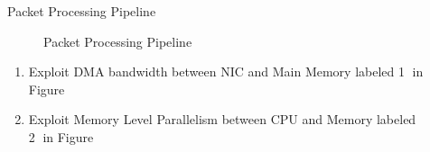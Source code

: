 \documentclass[final]{beamer}
\newlength{\sepwid}
\newlength{\onecolwid}
\newlength{\twocolwid}
\begin{document}
\begin{frame}
\begin{columns}[t]
\begin{column}{\onecolwid}
\begin{exampleblock}{Packet Processing Pipeline}
\begin{figure}
\caption{Packet Processing Pipeline}
\end{figure}
\begin{enumerate}[*]
 \item Exploit DMA bandwidth between NIC and Main Memory labeled \textcircled{1} in Figure
 \item Exploit Memory Level Parallelism between CPU and Memory labeled \textcircled{2} in Figure
\end{enumerate}
\end{exampleblock}




\end{column} %

\begin{column}{\sepwid}\end{column} %

\begin{column}{\twocolwid} %





\end{column}
\end{columns}
\end{frame}
\end{document}
